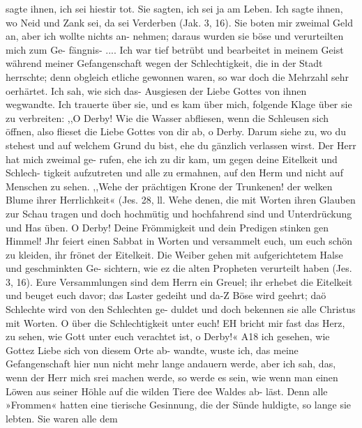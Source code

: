 sagte ihnen, ich sei hiestir tot. Sie sagten, ich sei ja am Leben.
Ich sagte ihnen, wo Neid und Zank sei, da sei Verderben (Jak. 3, 16).
Sie boten mir zweimal Geld an, aber ich wollte nichts an-
nehmen; daraus wurden sie böse und verurteilten mich zum Ge-
fängnis- ....
Ich war tief betrübt und bearbeitet in meinem Geist während
meiner Gefangenschaft wegen der Schlechtigkeit, die in der Stadt
herrschte; denn obgleich etliche gewonnen waren, so war doch die
Mehrzahl sehr oerhärtet. Ich sah, wie sich das- Ausgiesen der
Liebe Gottes von ihnen wegwandte. Ich trauerte über sie, und
es kam über mich, folgende Klage über sie zu verbreiten:
,,O Derby! Wie die Wasser abfliesen, wenn die Schleusen
sich öffnen, also flieset die Liebe Gottes von dir ab, o Derby.
Darum siehe zu, wo du stehest und auf welchem Grund du bist,
ehe du gänzlich verlassen wirst. Der Herr hat mich zweimal ge-
rufen, ehe ich zu dir kam, um gegen deine Eitelkeit und Schlech-
tigkeit aufzutreten und alle zu ermahnen, auf den Herm und
nicht auf Menschen zu sehen. ,,Wehe der prächtigen Krone der
Trunkenen! der welken Blume ihrer Herrlichkeit« (Jes. 28, ll.
Wehe denen, die mit Worten ihren Glauben zur Schau tragen und
doch hochmütig und hochfahrend sind und Unterdrückung und Has
üben. O Derby! Deine Frömmigkeit und dein Predigen stinken
gen Himmel! Jhr feiert einen Sabbat in Worten und versammelt
euch, um euch schön zu kleiden, ihr frönet der Eitelkeit. Die
Weiber gehen mit aufgerichtetem Halse und geschminkten Ge-
sichtern, wie ez die alten Propheten verurteilt haben (Jes. 3, 16).
Eure Versammlungen sind dem Herrn ein Greuel; ihr erhebet
die Eitelkeit und beuget euch davor; das Laster gedeiht und da-Z
Böse wird geehrt; daö Schlechte wird von den Schlechten ge-
duldet und doch bekennen sie alle Christus mit Worten. O über
die Schlechtigkeit unter euch! EH bricht mir fast das Herz, zu
sehen, wie Gott unter euch verachtet ist, o Derby!«
A18 ich gesehen, wie Gottez Liebe sich von diesem Orte ab-
wandte, wuste ich, das meine Gefangenschaft hier nun nicht mehr
lange andauern werde, aber ich sah, das, wenn der Herr mich
srei machen werde, so werde es sein, wie wenn man einen
Löwen aus seiner Höhle auf die wilden Tiere dee Waldes ab-
läst. Denn alle »Frommen« hatten eine tierische Gesinnung, die
der Sünde huldigte, so lange sie lebten. Sie waren alle dem


